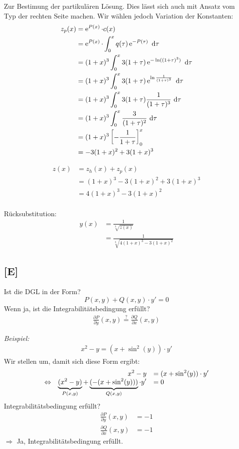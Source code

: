 \documentclass[main.tex]{subfiles}
\begin{document}
Zur Bestimung der partikulären Lösung. Dies lässt sich auch mit Ansatz vom Typ der rechten Seite machen. Wir wählen jedoch Variation der Konstanten: 
\begin{align*}
	z_p(x) &= \operatorname{\mathrm{e}}^{P(x)} \cdot c(x)\\
		   &= \operatorname{\mathrm{e}}^{P(x)} \cdot \int_0^x q(\tau)\operatorname{\mathrm{e}}^{-P(\tau)} ~\mathrm{d}\tau\\
		   &= (1+x)^3 \int_0^x 3(1+\tau) \operatorname{\mathrm{e}}^{-\ln((1+\tau)^3)} ~\mathrm{d}\tau \\
		   &= (1+x)^3 \int_0^x 3(1+\tau) \operatorname{\mathrm{e}}^{\ln\frac{1}{(1+\tau)^3}} ~\mathrm{d}\tau \\
		   &= (1+x)^3 \int_0^x 3(1+\tau) \frac{1}{(1+\tau)^3} ~\mathrm{d}\tau \\
		   &= (1+x)^3 \int_0^x \frac{3}{(1+\tau)^2} ~\mathrm{d}\tau \\
		   &= (1+x)^3 \left[ - \frac{1}{1+\tau} \right]_0^x \\
		   &= -3(1+x)^2 + 3(1+x)^3 \\
\end{align*}

\begin{align*}
	z(x) &= z_h(x) + z_p(x) \\
		 &= (1+x)^3 -3(1+x)^2 + 3(1+x)^3 \\
		 &= 4(1+x)^3 -3(1+x)^2 \\
\end{align*}

Rücksubstitution:
\begin{align*}
	y(x) &= \frac{1}{\sqrt[3]{z(x)}} \\
		 &= \frac{1}{\sqrt[3]{4(1+x)^3 -3(1+x)^2}}
\end{align*}

\subsection{[E]}
Ist die DGL in der Form?
$$
	P(x,y) + Q(x,y)\cdot y' = 0
$$
Wenn ja, ist die Integrabilitätsbedingung erfüllt?
\begin{align*}
	\frac{\partial P}{\partial y} (x,y) \overset{?}{=} \frac{\partial Q}{\partial x}(x,y)
\end{align*}

\textit{Beispiel:}\\
\begin{align*}
	x^2 -y = (x + \sin^2(y))\cdot y'
\end{align*}
Wir stellen um, damit sich diese Form ergibt: 
\[\everymath={\displaystyle}\begin{array}{crl}
				& x^2 -y &= (x + \sin^2(y)) \cdot y' \\
\Leftrightarrow & \underbrace{(x^2 -y)}_{P(x,y)} + \underbrace{(-(x+\sin^2(y)))}_{Q(x,y)} \cdot y' & = 0 \\
\end{array}\]
Integrabilitätsbedingung erfüllt?
\begin{align*}
	\frac{\partial P}{\partial y}(x,y) &= -1 \\
	\frac{\partial Q}{\partial x}(x,y) &= -1 
\end{align*}
$\Rightarrow$ Ja, Integrabilitätsbedingung erfüllt.
\end{document}
